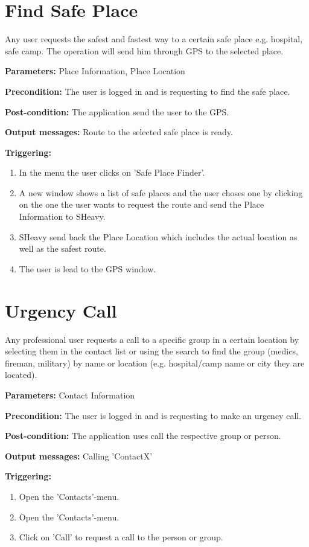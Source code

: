 \section{Find Safe Place}
\label{operation:FindSafePlace}
Any user requests the safest and fastest way to a certain safe place e.g. hospital,
safe camp. The operation will send him through GPS to the selected place.\\
\begin{description}
\item \textbf{Parameters:} Place Information, Place Location
\item \textbf{Precondition:} The user is logged in and is requesting to find the safe place.
\item \textbf{Post-condition:}  The application send the user to the GPS.
\item \textbf{Output messages:} Route to the selected safe place is ready.
\item \textbf{Triggering:}
\begin{enumerate}
\item In the menu the user clicks on 'Safe Place Finder'.
\item A new window shows a list of safe places and the user choses one by 
clicking on the one the user wants to request the route and send the Place Information to SHeavy.
\item SHeavy send back the Place Location which includes the actual location as well as the safest route.
\item The user is lead to the GPS window.
\end{enumerate}
\end{description}

\section{Urgency Call}
\label{operation:UrgencyCall}
Any professional user requests a call to a specific group in a certain location by selecting 
them in the contact list or using the search to find the group (medics, fireman, military) 
by name or location (e.g. hospital/camp name or city they are located).\\
\begin{description}
\item \textbf{Parameters:} Contact Information
\item \textbf{Precondition:} The user is logged in and is requesting to make an urgency call.
\item \textbf{Post-condition:} The application uses call the respective group or person.
\item \textbf{Output messages:} Calling 'ContactX'
\item \textbf{Triggering:}
\begin{enumerate}
\item Open the 'Contacts'-menu.
\item Open the 'Contacts'-menu.
\item Click on 'Call' to request a call to the person or group.
\end{enumerate}
\end{description} 

